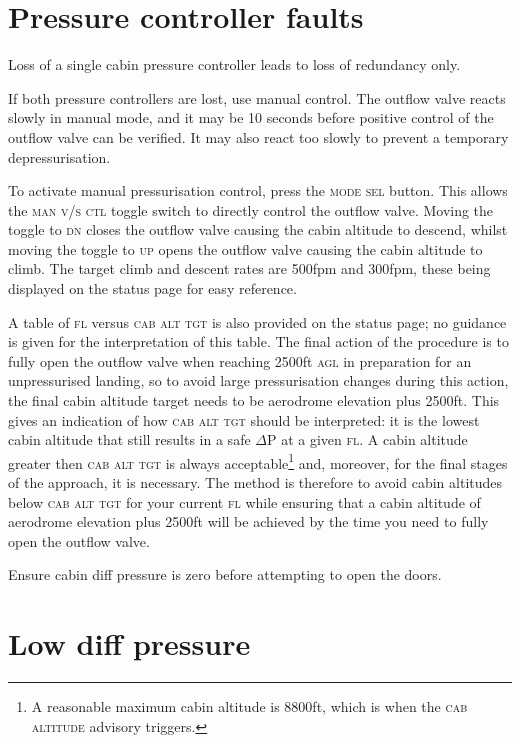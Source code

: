 \documentclass[a5paper,11pt,twoside]{book}
\newcommand{\ac}[1]{{\scshape\MakeLowercase{#1}}}
\newcommand{\inlcite}[1]{{\ac{#1}}}
\newcommand{\multicite}[1]{%
  \nopagebreak
  \noindent{{\color{blue}\footnotesize[ \inlcite{#1} ]}}
}
\begin{document}
\section{Pressure controller faults}

Loss of a single cabin pressure controller leads to loss of redundancy only.

If both pressure controllers are lost, use manual control. The outflow valve
reacts slowly in manual mode, and it may be 10 seconds before positive control
of the outflow valve can be verified. It may also react too slowly to prevent a
temporary depressurisation.

To activate manual pressurisation control, press the \ac{MODE SEL} button. This
allows the \ac{MAN V/S CTL} toggle switch to directly control the outflow
valve. Moving the toggle to \ac{DN} closes the outflow valve causing the cabin
altitude to descend, whilst moving the toggle to \ac{UP} opens the outflow valve
causing the cabin altitude to climb. The target climb and descent rates are
500fpm and 300fpm, these being displayed on the status page for easy reference.

A table of \ac{FL} versus \ac{CAB ALT TGT} is also provided on the status page;
no guidance is given for the interpretation of this table. The final action of
the procedure is to fully open the outflow valve when reaching 2500ft \ac{AGL}
in preparation for an unpressurised landing, so to avoid large pressurisation
changes during this action, the final cabin altitude target needs to be
aerodrome elevation plus 2500ft. This gives an indication of how \ac{CAB ALT
  TGT} should be interpreted: it is the lowest cabin altitude that still results
in a safe $\Delta$P at a given \ac{FL}. A cabin altitude greater then \ac{CAB
  ALT TGT} is always acceptable\footnote{A reasonable maximum cabin altitude is
8800ft, which is when the \ac{CAB ALTITUDE} advisory triggers.} and, moreover,
for the final stages of the approach, it is necessary. The method is therefore
to avoid cabin altitudes below \ac{CAB ALT TGT} for your current \ac{FL} while
ensuring that a cabin altitude of aerodrome elevation plus 2500ft will be
achieved by the time you need to fully open the outflow valve.

Ensure cabin diff pressure is zero before attempting to open the doors.

\multicite{\uline{CAB~PR}~SYS~1(2)(1+2)~FAULT, FCOM~PRO.AEP.CAB~PR}


\section{Low diff pressure}
\end{document}
